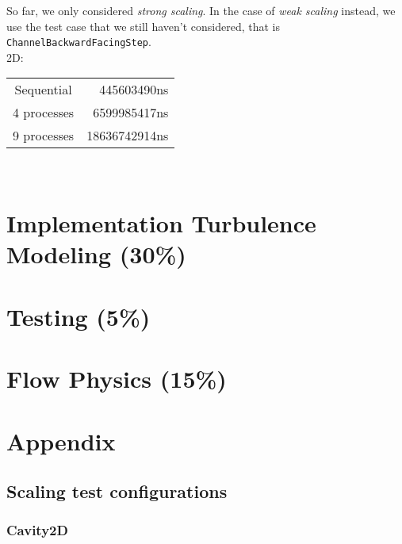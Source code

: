 \documentclass[
  english,        %
  font=palatino,     %
  onecolumn,      %
]{tumarticle}
\begin{document}
So far, we only considered \textit{strong scaling}. In the case of \textit{weak scaling} instead, we use the test case that we still haven't considered, that is \texttt{ChannelBackwardFacingStep}.
\\

2D:

\begin{tabular}{c r}
  Sequential  & 445603490ns   \\
  4 processes & 6599985417ns  \\
  9 processes & 18636742914ns \\
\end{tabular}
\\
























\section{Implementation Turbulence Modeling (30\%)}

\section{Testing (5\%)}

\section{Flow Physics (15\%)}

\newpage

\section*{Appendix}\label{appendix}

\subsection*{Scaling test configurations}

\subsubsection*{Cavity2D}
\end{document}
